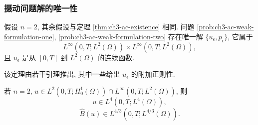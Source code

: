 \subsubsection{摄动问题解的唯一性}
\label{subsubsec:ch3-ac-uniqueness}

\begin{Theorem}
\label{thm:ch3-ac-uniqueness}
假设 $n=2$, 其余假设与定理 \ref{thm:ch3-ac-existence} 相同. 问题 \ref{prob:ch3-ac-weak-formulation-one}, \ref{prob:ch3-ac-weak-formulation-two} 存在唯一解 $\{u_\epsilon,p_\epsilon\}$, 它属于
\[
L^\infty(0,T;L^2(\Omega))\times L^\infty(0,T;L^2(\Omega)),
\]
且 $u_\epsilon$ 是从 $[0,T]$ 到 $L^2(\Omega)$ 的连续函数.
\end{Theorem}

该定理由若干引理推出, 其中一些给出 $u_\epsilon$ 的附加正则性.

\begin{Lemma}
\label{lem:ch3-ac-two-dimensional-regularity}
若 $n=2$, $u\in L^2(0,T;H_0^1(\Omega))\cap L^\infty(0,T;L^2(\Omega))$, 则
\begin{equation}
u\in L^4(0,T;L^4(\Omega)),
\label{eq:ch3-ac-l4-regularity}
\end{equation}
\begin{equation}
\widehat B(u)\in L^{4/3}(0,T;L^{4/3}(\Omega)).
\label{eq:ch3-ac-B-l43-regularity}
\end{equation}
\end{Lemma}

